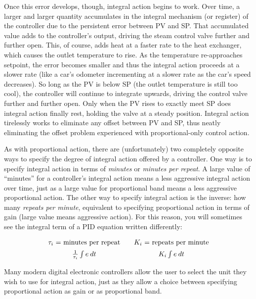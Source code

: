 Once this error develops, though, integral action begins to work.  Over time, a larger and larger quantity accumulates in the integral mechanism (or register) of the controller due to the persistent error between PV and SP.  That accumulated value adds to the controller's output, driving the steam control valve further and further open.  This, of course, adds heat at a faster rate to the heat exchanger, which causes the outlet temperature to rise.  As the temperature re-approaches setpoint, the error becomes smaller and thus the integral action proceeds at a slower rate (like a car's odometer incrementing at a slower rate as the car's speed decreases).  So long as the PV is below SP (the outlet temperature is still too cool), the controller will continue to integrate upwards, driving the control valve further and further open.  Only when the PV rises to exactly meet SP does integral action finally rest, holding the valve at a steady position.  Integral action tirelessly works to eliminate any offset between PV and SP, thus neatly eliminating the offset problem experienced with proportional-only control action.

\vskip 10pt

As with proportional action, there are (unfortunately) two completely opposite ways to specify the degree of integral action offered by a controller.  One way is to specify integral action in terms of \textit{minutes} or \textit{minutes per repeat}.  A large value of ``minutes'' for a controller's integral action means a less aggressive integral action over time, just as a large value for proportional band means a less aggressive proportional action.  The other way to specify integral action is the inverse: how many \textit{repeats per minute}, equivalent to specifying proportional action in terms of gain  (large value means aggressive action).  For this reason, you will sometimes see the integral term of a PID equation written differently:


$$\vbox{\offinterlineskip
\halign{\strut
\quad\hfil # \ \hfil & 
\quad\hfil # \ \hfil \cr
%
$\tau_i$ = minutes per repeat & $K_i$ = repeats per minute \cr
%
\noalign{\vskip 5pt}
%
${1 \over \tau_i} \int e \> dt$  &  $K_i \int e \> dt$ \cr
%
} %
}$$ %

Many modern digital electronic controllers allow the user to select the unit they wish to use for integral action, just as they allow a choice between specifying proportional action as gain or as proportional band.

